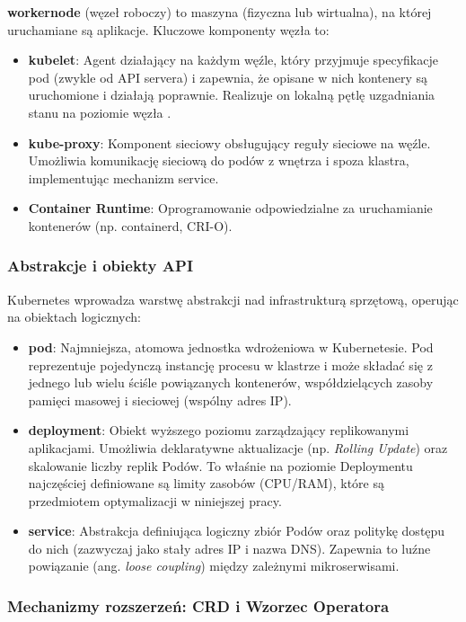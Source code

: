 \textbf{\Gls{workernode}} (węzeł roboczy) to maszyna (fizyczna lub wirtualna), na której uruchamiane są 
aplikacje. Kluczowe komponenty węzła to:
\begin{itemize}
    \item \textbf{kubelet}: Agent działający na każdym węźle, który przyjmuje specyfikacje \gls{pod} 
      (zwykle od API servera) i zapewnia, że opisane w nich kontenery są uruchomione i działają poprawnie. 
      Realizuje on lokalną pętlę uzgadniania stanu na poziomie węzła \cite{kubernetes_architecture}.
    \item \textbf{kube-proxy}: Komponent sieciowy obsługujący reguły sieciowe na węźle. Umożliwia 
      komunikację sieciową do podów z wnętrza i spoza klastra, implementując mechanizm \gls{service}.
    \item \textbf{Container Runtime}: Oprogramowanie odpowiedzialne za uruchamianie kontenerów 
      (np. containerd, CRI-O).
\end{itemize}

\subsubsection{Abstrakcje i obiekty API}

Kubernetes wprowadza warstwę abstrakcji nad infrastrukturą sprzętową, operując na obiektach logicznych:

\begin{itemize}
    \item \textbf{\Gls{pod}}: Najmniejsza, atomowa jednostka wdrożeniowa w Kubernetesie. Pod reprezentuje pojedynczą instancję procesu w klastrze i może składać się z jednego lub wielu ściśle powiązanych kontenerów, współdzielących zasoby pamięci masowej i sieciowej (wspólny adres IP).
    \item \textbf{\Gls{deployment}}: Obiekt wyższego poziomu zarządzający replikowanymi aplikacjami. Umożliwia deklaratywne aktualizacje (np. \textit{Rolling Update}) oraz skalowanie liczby replik Podów. To właśnie na poziomie Deploymentu najczęściej definiowane są limity zasobów (CPU/RAM), które są przedmiotem optymalizacji w niniejszej pracy.
    \item \textbf{\Gls{service}}: Abstrakcja definiująca logiczny zbiór Podów oraz politykę dostępu do nich (zazwyczaj jako stały adres IP i nazwa DNS). Zapewnia to luźne powiązanie (ang. \textit{loose coupling}) między zależnymi mikroserwisami.
\end{itemize}

\subsubsection{Mechanizmy rozszerzeń: CRD i Wzorzec Operatora}

